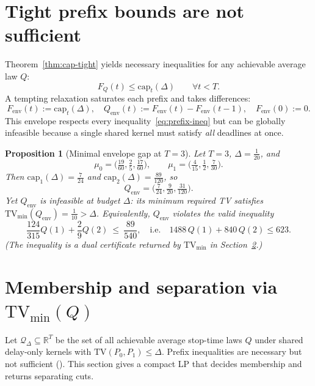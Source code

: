 \documentclass[11pt]{article}
\newtheorem{proposition}[theorem]{Proposition}
\newcommand{\TV}{\mathrm{TV}}
\newcommand{\cQ}{\mathcal{Q}}
\begin{document}
\section{Tight prefix bounds are not sufficient}\label{sec:envelope}

Theorem~\ref{thm:cap-tight} yields necessary inequalities for any achievable average law $Q$:
\begin{equation}\label{eq:prefix-ineq}
F_Q(t) \le \mathrm{cap}_t(\Delta)\qquad \forall t<T.
\end{equation}
A tempting relaxation saturates each prefix and takes differences:
\[
F_{\mathrm{env}}(t):=\mathrm{cap}_t(\Delta),\quad
Q_{\mathrm{env}}(t):=F_{\mathrm{env}}(t)-F_{\mathrm{env}}(t-1),\quad F_{\mathrm{env}}(0):=0.
\]
This envelope respects every inequality~\eqref{eq:prefix-ineq} but can be globally infeasible because a single shared kernel must satisfy \emph{all} deadlines at once.

\begin{proposition}[Minimal envelope gap at $T=3$]\label{prop:T3gap}
Let $T=3$, $\Delta=\tfrac{1}{20}$, and
\[
\mu_0=\Big(\tfrac{19}{60},\tfrac{2}{5},\tfrac{17}{60}\Big),\qquad
\mu_1=\Big(\tfrac{4}{15},\tfrac{1}{2},\tfrac{7}{30}\Big).
\]
Then $\mathrm{cap}_1(\Delta)=\tfrac{7}{24}$ and $\mathrm{cap}_2(\Delta)=\tfrac{89}{120}$, so
\[
Q_{\mathrm{env}}=\Big(\tfrac{7}{24},\tfrac{9}{20},\tfrac{31}{120}\Big).
\]
Yet $Q_{\mathrm{env}}$ is infeasible at budget $\Delta$: its minimum required TV satisfies $\TV_{\min}(Q_{\mathrm{env}})=\tfrac{1}{10}>\Delta$.
Equivalently, $Q_{\mathrm{env}}$ violates the valid inequality
\[
\frac{124}{315}Q(1)+\frac{2}{9}Q(2)\ \le\ \frac{89}{540},
\quad\text{i.e.}\quad 1488\,Q(1)+840\,Q(2)\le 623.
\]
(The inequality is a dual certificate returned by $\TV_{\min}$ in Section~\ref{sec:membership}.)
\end{proposition}

\section{\texorpdfstring{Membership and separation via $\TV_{\min}(Q)$}{Membership and separation via TVmin(Q)}}\label{sec:membership}

Let $\cQ_\Delta\subseteq\mathbb{R}^T$ be the set of all achievable average stop-time laws $Q$ under shared delay-only kernels with $\TV(P_0,P_1)\le \Delta$.
Prefix inequalities are necessary but not sufficient (). This section gives a compact LP that decides membership and returns separating cuts.
\end{document}
